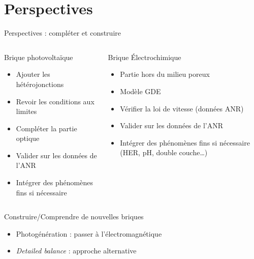
\section{Perspectives}
\begin{frame}[t]{Perspectives : compléter et construire}
  \vspace{0.4em}

  \begin{columns}[T,onlytextwidth]
      \begin{pcbanner}{Brique photovoltaïque}
        \begin{itemize}\footnotesize
          \item Ajouter les hétérojonctions
          \item Revoir les conditions aux limites
          \item Compléter la partie optique 
          \item Valider sur les données de l'ANR
          \item Intégrer des phénomènes fins si nécessaire
        \end{itemize}
      \end{pcbanner}
      \begin{pcbanner}{Brique Électrochimique}
        \begin{itemize}\footnotesize
          \item Partie hors du milieu poreux 
          \item Modèle GDE
          \item Vérifier la loi de vitesse (données ANR)
          \item Valider sur les données de l'ANR
          \item Intégrer des phénomènes fins si nécessaire (HER, pH, double couche\dots)
        \end{itemize}
      \end{pcbanner}
  \end{columns}

  \vspace{0.35em}
  \begin{columns}[T,onlytextwidth]
    \column{\textwidth}
      \begin{pcbanner}{Construire/Comprendre de nouvelles briques}
        \begin{itemize}\footnotesize
          \item Photogénération : passer à l'électromagnétique
          \item \textit{Detailed balance} : approche alternative 
        \end{itemize}
      \end{pcbanner}
  \end{columns}


\end{frame}
